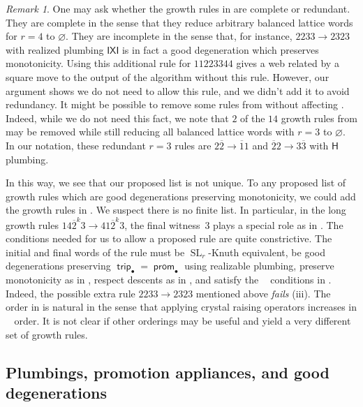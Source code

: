 \documentclass{amsart}
\theoremstyle{definition}
\theoremstyle{remark}
\newtheorem{remark}[theorem]{Remark}
\numberwithin{equation}{section}
\DeclareMathOperator{\trip}{\mathsf{trip}}
\DeclareMathOperator{\prom}{\mathsf{prom}}
\DeclareMathOperator{\SL}{SL}
\DeclareMathOperator{\tlex}{l\widetilde{ex}}
\begin{document}
\begin{remark}\label{rem:complete-redundant}
    One may ask whether the growth rules in  are complete or redundant. They are complete in the sense that they reduce arbitrary balanced lattice words for $r=4$ to $\varnothing$. They are incomplete in the sense that, for instance, $2233 \to 2323$ with realized plumbing $\mathsf{IXI}$ is in fact a good degeneration which preserves monotonicity. Using this additional rule for $11223344$ gives a web related by a square move to the output of the algorithm without this rule. However, our argument shows we do not need to allow this rule, and we didn't add it to avoid redundancy. It might be possible to remove some rules from  without affecting . Indeed, while we do not need this fact, we note that $2$ of the $14$ growth rules from \cite{Khovanov-Kuperberg} may be removed while still reducing all balanced lattice words with $r=3$ to $\varnothing$. In our notation, these redundant $r=3$ rules are $2\overline{2} \to \overline{1}1$ and $\overline{2}2 \to 3\overline{3}$ with $\mathsf{H}$ plumbing.
    
    In this way, we see that our proposed list is not unique. To any proposed list of growth rules which are good degenerations preserving monotonicity, we could add the growth rules in . We suspect there is no finite list. In particular, in the long growth rules $14\overline{2}^k3 \to 41\overline{2}^k3$, the final witness~$3$ plays a special role as in . The conditions needed for us to allow a proposed rule are quite constrictive. The initial and final words of the rule must be $\SL_r$-Knuth equivalent, be good degenerations preserving $\trip_\bullet = \prom_\bullet$ using realizable plumbing, preserve monotonicity as in , respect descents as in , and satisfy the $\tlex$ conditions in . Indeed, the possible extra rule $2233 \to 2323$ mentioned above \textit{fails} (iii). The $\tlex$ order in  is natural in the sense that applying crystal raising operators increases in $\tlex$ order. It is not clear if other orderings may be useful and yield a very different set of growth rules.
\end{remark}

\subsection{Plumbings, promotion appliances, and good degenerations}\label{sec:plumbing}
\end{document}
